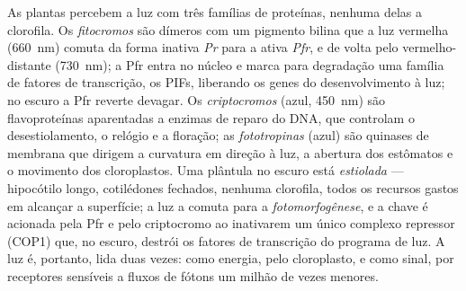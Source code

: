\begin{definition}[Fotorreceptores]\label{def:b3:plant-molecular-physiology:photoreceptors}
As plantas percebem a luz com três famílias de proteínas, nenhuma delas
a clorofila. Os \emph{fitocromos} são dímeros com um pigmento bilina que
a luz vermelha (\qty{660}{nm}) comuta da forma inativa \emph{Pr} para a
ativa \emph{Pfr}, e de volta pelo vermelho-distante (\qty{730}{nm}); a
Pfr entra no núcleo e marca para degradação uma família de fatores de
transcrição, os PIFs, liberando os genes do desenvolvimento à luz; no
escuro a Pfr reverte devagar. Os \emph{criptocromos} (azul,
\qty{450}{nm}) são flavoproteínas aparentadas a enzimas de reparo do
DNA, que controlam o desestiolamento, o relógio e a floração; as
\emph{fototropinas} (azul) são quinases de membrana que dirigem a
curvatura em direção à luz, a abertura dos estômatos e o movimento dos
cloroplastos. Uma plântula no escuro está \emph{estiolada} --- hipocótilo
longo, cotilédones fechados, nenhuma clorofila, todos os recursos gastos
em alcançar a superfície; a luz a comuta para a \emph{fotomorfogênese}, e
a chave é acionada pela Pfr e pelo criptocromo ao inativarem um único
complexo repressor (COP1) que, no escuro, destrói os fatores de
transcrição do programa de luz. A luz é, portanto, lida duas vezes: como
energia, pelo cloroplasto, e como sinal, por receptores sensíveis a
fluxos de fótons um milhão de vezes menores.
\end{definition}

